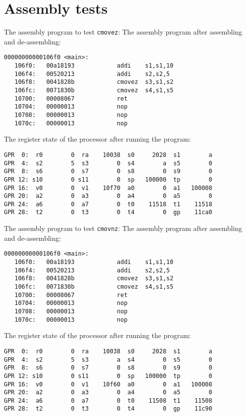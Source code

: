 \documentclass[12pt,twoside,notitlepage]{report}
\begin{document}
%

\section{Assembly tests}


The assembly program to test \texttt{cmovez}:
%
The assembly program after assembling and de-assembling:
\begin{lstlisting}
00000000000106f0 <main>:
   106f0:	00a18193          	addi	s1,s1,10
   106f4:	00520213          	addi	s2,s2,5
   106f8:	0041828b          	cmovez	s3,s1,s2
   106fc:	0071830b          	cmovez	s4,s1,s5
   10700:	00008067          	ret
   10704:	00000013          	nop
   10708:	00000013          	nop
   1070c:	00000013          	nop
\end{lstlisting}
The register state of the processor after running the program:
\begin{verbatim}
GPR  0:  r0        0  ra    10038  s0     2028  s1        a
GPR  4:  s2        5  s3        0  s4        a  s5        0
GPR  8:  s6        0  s7        0  s8        0  s9        0
GPR 12: s10        0 s11        0  sp   100000  tp        0
GPR 16:  v0        0  v1    10f70  a0        0  a1   100008
GPR 20:  a2        0  a3        0  a4        0  a5        0
GPR 24:  a6        0  a7        0  t0    11518  t1    11518
GPR 28:  t2        0  t3        0  t4        0  gp    11ca0
\end{verbatim}

The assembly program to test \texttt{cmovnz}:
%
The assembly program after assembling and de-assembling:
\begin{lstlisting}
00000000000106f0 <main>:
   106f0:	00a18193          	addi	s1,s1,10
   106f4:	00520213          	addi	s2,s2,5
   106f8:	0041828b          	cmovez	s3,s1,s2
   106fc:	0071830b          	cmovez	s4,s1,s5
   10700:	00008067          	ret
   10704:	00000013          	nop
   10708:	00000013          	nop
   1070c:	00000013          	nop
\end{lstlisting}
The register state of the processor after running the program:
\begin{verbatim}
GPR  0:  r0        0  ra    10038  s0     2028  s1        a
GPR  4:  s2        5  s3        a  s4        0  s5        0
GPR  8:  s6        0  s7        0  s8        0  s9        0
GPR 12: s10        0 s11        0  sp   100000  tp        0
GPR 16:  v0        0  v1    10f60  a0        0  a1   100008
GPR 20:  a2        0  a3        0  a4        0  a5        0
GPR 24:  a6        0  a7        0  t0    11508  t1    11508
GPR 28:  t2        0  t3        0  t4        0  gp    11c90
\end{verbatim}
\end{document}
